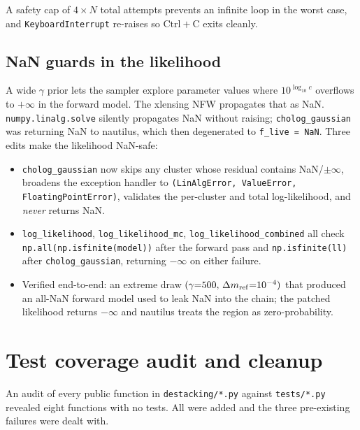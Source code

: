 \documentclass[11pt,a4paper]{article}
\newcommand{\dm}{\Delta m}
\begin{document}
A safety cap of $4\times N$ total attempts prevents an infinite loop in
the worst case, and \texttt{KeyboardInterrupt} re-raises so $\mathrm{Ctrl{+}C}$
exits cleanly.

\subsection{NaN guards in the likelihood}

A wide $\gamma$ prior lets the sampler explore parameter values where
$10^{\log_{10}c}$ overflows to $+\infty$ in the forward model.  The
xlensing NFW propagates that as NaN.  \texttt{numpy.linalg.solve} silently
propagates NaN without raising; \texttt{cholog\_gaussian} was returning
NaN to nautilus, which then degenerated to \texttt{f\_live = NaN}.  Three
edits make the likelihood NaN-safe:

\begin{itemize}[noitemsep]
  \item \texttt{cholog\_gaussian} now skips any cluster whose residual
        contains NaN/$\pm\infty$, broadens the exception handler to
        \texttt{(LinAlgError, ValueError, FloatingPointError)}, validates
        the per-cluster and total log-likelihood, and \emph{never} returns
        NaN.
  \item \texttt{log\_likelihood}, \texttt{log\_likelihood\_mc},
        \texttt{log\_likelihood\_combined} all check
        \texttt{np.all(np.isfinite(model))} after the forward pass and
        \texttt{np.isfinite(ll)} after \texttt{cholog\_gaussian}, returning
        $-\infty$ on either failure.
  \item Verified end-to-end: an extreme draw
        $(\gamma{=}500,\,\dm_{\rm ref}{=}10^{-4})$ that produced an
        all-NaN forward model used to leak NaN into the chain; the patched
        likelihood returns $-\infty$ and nautilus treats the region as
        zero-probability.
\end{itemize}

\section{Test coverage audit and cleanup}

An audit of every public function in \texttt{destacking/*.py} against
\texttt{tests/*.py} revealed eight functions with no tests.  All were
added and the three pre-existing failures were dealt with.
\end{document}
